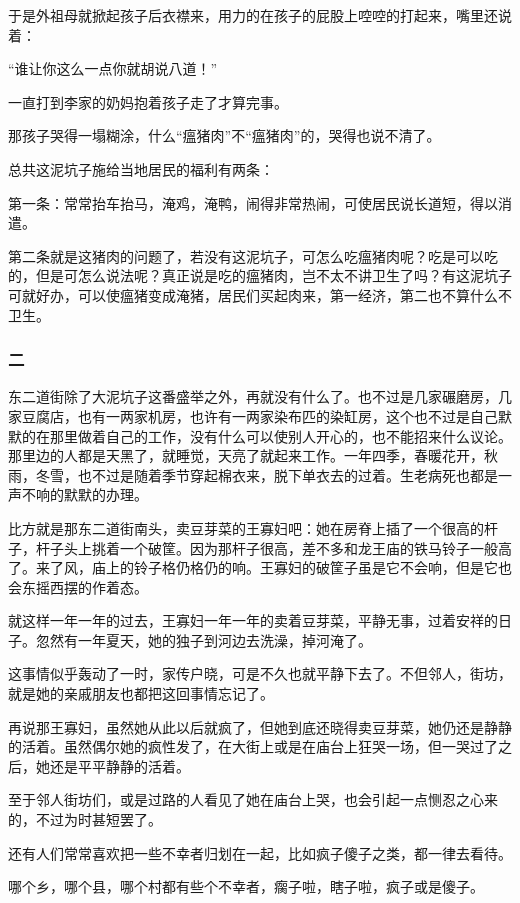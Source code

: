\par 于是外祖母就掀起孩子后衣襟来，用力的在孩子的屁股上啌啌的打起来，嘴里还说着：
\par “谁让你这么一点你就胡说八道！”
\par 一直打到李家的奶妈抱着孩子走了才算完事。
\par 那孩子哭得一塌糊涂，什么“瘟猪肉”不“瘟猪肉”的，哭得也说不清了。
\par 总共这泥坑子施给当地居民的福利有两条：
\par 第一条：常常抬车抬马，淹鸡，淹鸭，闹得非常热闹，可使居民说长道短，得以消遣。
\par 第二条就是这猪肉的问题了，若没有这泥坑子，可怎么吃瘟猪肉呢？吃是可以吃的，但是可怎么说法呢？真正说是吃的瘟猪肉，岂不太不讲卫生了吗？有这泥坑子可就好办，可以使瘟猪变成淹猪，居民们买起肉来，第一经济，第二也不算什么不卫生。
\subsubsection*{二}
\par 东二道街除了大泥坑子这番盛举之外，再就没有什么了。也不过是几家碾磨房，几家豆腐店，也有一两家机房，也许有一两家染布匹的染缸房，这个也不过是自己默默的在那里做着自己的工作，没有什么可以使别人开心的，也不能招来什么议论。那里边的人都是天黑了，就睡觉，天亮了就起来工作。一年四季，春暖花开，秋雨，冬雪，也不过是随着季节穿起棉衣来，脱下单衣去的过着。生老病死也都是一声不响的默默的办理。
\par 比方就是那东二道街南头，卖豆芽菜的王寡妇吧：她在房脊上插了一个很高的杆子，杆子头上挑着一个破筐。因为那杆子很高，差不多和龙王庙的铁马铃子一般高了。来了风，庙上的铃子格仍格仍的响。王寡妇的破筐子虽是它不会响，但是它也会东摇西摆的作着态。
\par 就这样一年一年的过去，王寡妇一年一年的卖着豆芽菜，平静无事，过着安祥的日子。忽然有一年夏天，她的独子到河边去洗澡，掉河淹了。
\par 这事情似乎轰动了一时，家传户晓，可是不久也就平静下去了。不但邻人，街坊，就是她的亲戚朋友也都把这回事情忘记了。
\par 再说那王寡妇，虽然她从此以后就疯了，但她到底还晓得卖豆芽菜，她仍还是静静的活着。虽然偶尔她的疯性发了，在大街上或是在庙台上狂哭一场，但一哭过了之后，她还是平平静静的活着。
\par 至于邻人街坊们，或是过路的人看见了她在庙台上哭，也会引起一点恻忍之心来的，不过为时甚短罢了。
\par 还有人们常常喜欢把一些不幸者归划在一起，比如疯子傻子之类，都一律去看待。
\par 哪个乡，哪个县，哪个村都有些个不幸者，瘸子啦，瞎子啦，疯子或是傻子。
